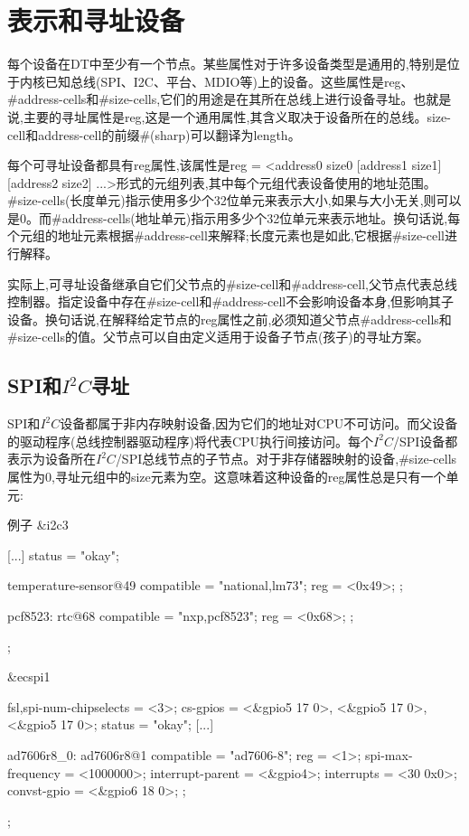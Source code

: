 \documentclass[lang=cn,newtx,10pt,scheme=chinese]{elegantbook}
\begin{document}
\section{表示和寻址设备}

每个设备在DT中至少有一个节点。某些属性对于许多设备类型是通用的,特别是位于内核已知总线(SPI、I2C、平台、MDIO等)上的设备。这些属性是reg、\#address-cells和\#size-cells,它们的用途是在其所在总线上进行设备寻址。也就是说,主要的寻址属性是reg,这是一个通用属性,其含义取决于设备所在的总线。size-cell和address-cell的前缀\#(sharp)可以翻译为length。

每个可寻址设备都具有reg属性,该属性是reg = <address0 size0 [address1 size1] [address2 size2] ...>形式的元组列表,其中每个元组代表设备使用的地址范围。\#size-cells(长度单元)指示使用多少个32位单元来表示大小,如果与大小无关,则可以是0。而\#address-cells(地址单元)指示用多少个32位单元来表示地址。换句话说,每个元组的地址元素根据\#address-cell来解释;长度元素也是如此,它根据\#size-cell进行解释。

实际上,可寻址设备继承自它们父节点的\#size-cell和\#address-cell,父节点代表总线控制器。指定设备中存在\#size-cell和\#address-cell不会影响设备本身,但影响其子设备。换句话说,在解释给定节点的reg属性之前,必须知道父节点\#address-cells和\#size-cells的值。父节点可以自由定义适用于设备子节点(孩子)的寻址方案。

\subsection{SPI和\texorpdfstring{$I^2C$寻址}{I2C寻址}}

SPI和$I^2C$设备都属于非内存映射设备,因为它们的地址对CPU不可访问。而父设备的驱动程序(总线控制器驱动程序)将代表CPU执行间接访问。每个$I^2C$/SPI设备都表示为设备所在$I^2C$/SPI总线节点的子节点。对于非存储器映射的设备,\#size-cells属性为0,寻址元组中的size元素为空。这意味着这种设备的reg属性总是只有一个单元:

\begin{mycode}{例子}
&i2c3 {
    [...]
    status = "okay";

    temperature-sensor@49 {
        compatible = "national,lm73";
        reg = <0x49>;
    };

    pcf8523: rtc@68 {
        compatible = "nxp,pcf8523";
        reg = <0x68>;
    };
};

&ecspi1 {
    fsl,spi-num-chipselects = <3>;
    cs-gpios = <&gpio5 17 0>, <&gpio5 17 0>, <&gpio5 17 0>;
    status = "okay";
    [...]

    ad7606r8_0: ad7606r8@1 {
        compatible = "ad7606-8";
        reg = <1>;
        spi-max-frequency = <1000000>;
        interrupt-parent = <&gpio4>;
        interrupts = <30 0x0>;
        convst-gpio = <&gpio6 18 0>;
    };
};
\end{mycode}
\end{document}
